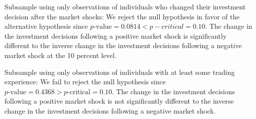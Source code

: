 \documentclass[12pt, a4paper]{article}
\theoremstyle{remark}
\begin{document}
Subsample using only observations of individuals who changed their investment decision after the market shocks: We reject the null hypothesis in favor of the alternative hypothesis since $p\text{-value} = 0.0814 < p-critical = 0.10$. The change in the investment decisions following a positive market shock is significantly different to the inverse change in the investment decisions following a negative market shock at the 10 percent level.

Subsample using only observations of individuals with at least some trading experience: We fail to reject the null hypothesis since $p\text{-value} = 0.4368 > p\text{-critical} = 0.10$. The change in the investment decisions following a positive market shock is not significantly different to the inverse change in the investment decisions following a negative market shock.
\end{document}
